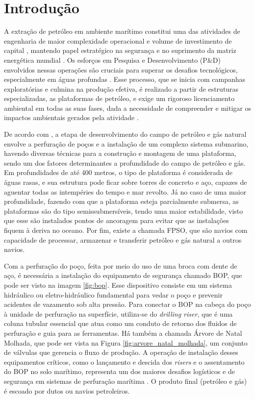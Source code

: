 \chapter{Introdução}
\label{cap:introducao}

A extração de petróleo em ambiente marítimo constitui uma das atividades de engenharia de maior complexidade operacional e volume de investimento de capital \cite{CHAKRABARTI20051}, mantendo papel estratégico na segurança e no suprimento da matriz energética mundial \cite{iea2025world}. Os esforços em Pesquisa e Desenvolvimento (P\&D) envolvidos nessas operações são cruciais para superar os desafios tecnológicos, especialmente em águas profundas \cite{Morais_2011}. Esse processo, que se inicia com campanhas exploratórias e culmina na produção efetiva, é realizado a partir de estruturas especializadas, as plataformas de petróleo, e exige um rigoroso licenciamento ambiental em todas as suas fases, dada a necessidade de compreender e mitigar os impactos ambientais gerados pela atividade \cite{Martins_2015}.

De acordo com \cite{MME_2023}, a etapa de desenvolvimento do campo de petróleo e gás natural envolve a perfuração de poços e a instalação de um complexo sistema submarino, havendo diversas técnicas para a construção e montagem de uma plataforma, sendo um dos fatores determinantes a profundidade do campo de petróleo e gás. Em profundidades de até 400 metros, o tipo de plataforma é considerada de águas rasas, e sua estrutura pode ficar sobre torres de concreto e aço, capazes de aguentar todas as intempéries do tempo e mar revolto. Já no caso de uma maior profundidade, fazendo com que a plataforma esteja parcialmente submersa, as plataformas são do tipo semissubmersíveis, tendo uma maior estabilidade, visto que esse são instalados pontos de ancoragem para evitar que as instalações fiquem à deriva no oceano. Por fim, existe a chamada \gls{FPSO}, que são navios com capacidade de processar, armazenar e transferir petróleo e gás natural a outros navios.

Com a perfuração do poço, feita por meio do uso de uma broca com dente de aço, é necessária a instalação do equipamento de segurança chamado \gls{BOP}, que pode ser visto na imagem \ref{fig:bop}. Esse dispositivo consiste em um sistema hidráulico ou eletro-hidráulico fundamental para vedar o poço e prevenir acidentes de vazamento sob alta pressão. Para conectar o \gls{BOP} na cabeça do poço à unidade de perfuração na superfície, utiliza-se do \textit{drilling riser}, que é uma coluna tubular essencial que atua como um conduto de retorno dos fluidos de perfuração e guia para as ferramentas. Há também a chamada Árvore de Natal Molhada, que pode ser vista na Figura \ref{fig:arvore_natal_molhada}, um conjunto de válvulas que gerencia o fluxo de produção. A operação de instalação desses equipamentos críticos, como o lançamento e descida dos \textit{risers} e o assentamento do \gls{BOP} no solo marítimo, representa um dos maiores desafios logísticos e de segurança em sistemas de perfuração marítima \cite{Tsukada_2007}. O produto final (petróleo e gás) é escoado por dutos ou navios petroleiros.

